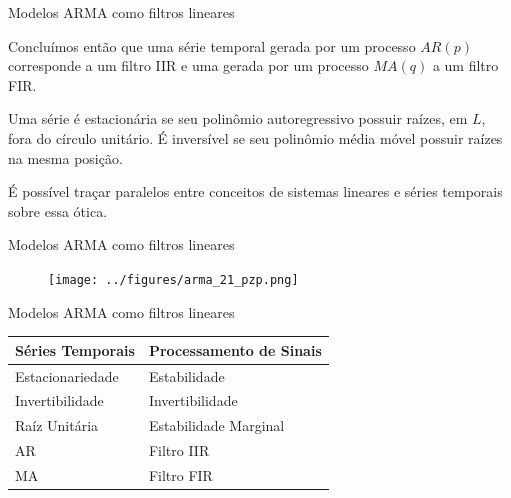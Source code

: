 \documentclass [xcolor=svgnames, t] {beamer}
\begin{document}
\begin{frame}{Modelos ARMA como filtros lineares}

Concluímos então que uma série temporal gerada por um processo $AR(p)$
corresponde a um filtro IIR e uma gerada por um processo $MA(q)$ a um filtro
FIR.

\vspace{5mm}

Uma série é estacionária se seu polinômio autoregressivo possuir raízes,
em $L$, fora do círculo unitário. É inversível se seu polinômio média móvel
possuir raízes na mesma posição.

\vspace{5mm}

É possível traçar paralelos entre conceitos de sistemas lineares e séries
temporais sobre essa ótica.

\end{frame}

\begin{frame}{Modelos ARMA como filtros lineares}


    \begin{figure}[H]
        \centering
        \texttt{[image: ../figures/arma\_21\_pzp.png]}
    \end{figure}

\end{frame}


\begin{frame}{Modelos ARMA como filtros lineares}

\vspace{5mm}

\begin{table}[H]
\centering
\begin{tabular}{|l|l|}
\hline
\textbf{Séries Temporais} & \textbf{Processamento de Sinais} \\ \hline
Estacionariedade          & Estabilidade                     \\ \hline
Invertibilidade           & Invertibilidade                  \\ \hline
Raíz Unitária             & Estabilidade Marginal            \\ \hline
AR                        & Filtro IIR                       \\ \hline
MA                        & Filtro FIR                       \\ \hline
\end{tabular}
\end{table}

\end{frame}
\end{document}
